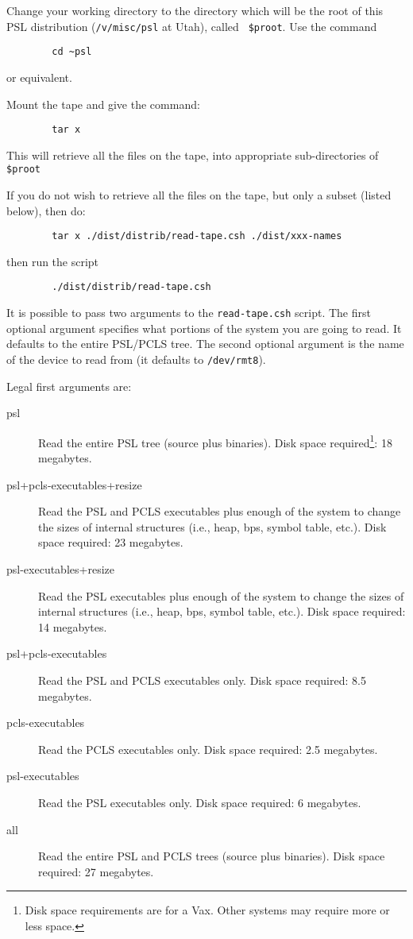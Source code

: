 Change your working directory to the directory which will be the root
of this PSL distribution ({\tt /v/misc/psl} at Utah), called {\tt
\$proot}.  Use the command
\begin{verbatim}
        cd ~psl
\end{verbatim}
or equivalent.

Mount the tape and give
the command:
\begin{verbatim}
        tar x
\end{verbatim}
This will retrieve all the files on the tape, into appropriate
sub-directories of {\tt \$proot}

If you do not wish to retrieve all the files on the tape,
but only a subset (listed below), then do:
\begin{verbatim}
        tar x ./dist/distrib/read-tape.csh ./dist/xxx-names
\end{verbatim}
then run the script
\begin{verbatim}
        ./dist/distrib/read-tape.csh
\end{verbatim}

It is possible to pass two arguments to the {\tt read-tape.csh} script.  The
first optional argument specifies what portions of the system you are
going to read.  It defaults to the entire PSL/PCLS tree.  The second
optional argument is the name of the device to read from (it defaults
to {\tt /dev/rmt8}).

Legal first arguments are:

\begin{description}
\item[psl]
Read the entire PSL tree (source plus binaries).
Disk space required\footnote{Disk space requirements are for a Vax.  Other
systems may require more or less space.}: 18 megabytes.

\item[psl+pcls-executables+resize]
Read the PSL and PCLS executables plus enough of the system to change
the sizes of internal structures (i.e., heap, bps, symbol table,
etc.).  Disk space required: 23 megabytes.

\item[psl-executables+resize]
Read the PSL executables plus enough of the system to change
the sizes of internal structures (i.e., heap, bps, symbol table,
etc.).  Disk space required: 14 megabytes.

\item[psl+pcls-executables]
Read the PSL and PCLS executables only.  Disk space required: 8.5 megabytes.

\item[pcls-executables]
Read the PCLS executables only.  Disk space required: 2.5 megabytes.

\item[psl-executables]
Read the PSL executables only.  Disk space required: 6 megabytes.

\item[all]
Read the entire PSL and PCLS trees (source plus binaries).  Disk space
required: 27 megabytes.

\end{description}


